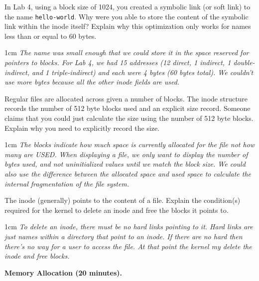 \documentclass[12pt]{article}
\newenvironment{answer}{\begin{adjustwidth}{1cm}{}\itshape}{\end{adjustwidth}}
\begin{document}
In Lab 4, using a block size of 1024, you created a symbolic link (or soft link)
to the name \texttt{hello-world}.
Why were you able to store the content of the symbolic link within the inode itself?
Explain why this optimization only works for names less than or equal to 60 bytes.

\begin{answer}
  The name was small enough that we could store it in the space reserved for
  pointers to blocks. For Lab 4, we had 15 addresses (12 direct, 1 indirect, 1
  double-indirect, and 1 triple-indirect) and each were 4 bytes (60 bytes
  total). We couldn't use more bytes because all the other inode fields are
  used.
\end{answer}

\vspace{1em}

Regular files are allocated across given a number of blocks. The inode
structure records the number of 512 byte blocks used and an explicit size record.
Someone claims that you could just calculate the size using the number of 512 byte
blocks. Explain why you need to explicitly record the size.

\begin{answer}
  The blocks indicate how much space is currently allocated for the file not how
  many are USED. When displaying a file, we only want to display the number of
  bytes used, and not uninitialized values until we match the block size.
  We could also use the difference between the allocated space and used space to
  calculate the internal fragmentation of the file system.
\end{answer}

\vspace{1em}

The inode (generally) points to the content of a file.
Explain the condition(s) required for the kernel to delete an inode and free the blocks
it points to.

\begin{answer}
  To delete an inode, there must be no hard links pointing to it. Hard links are
  just names within a directory that point to an inode. If there are no hard
  then there's no way for a user to access the file. At that point the kernel
  my delete the inode and free blocks.
\end{answer}

\newpage

\textbf{Memory Allocation (20 minutes).}

\vspace{1em}
\end{document}
